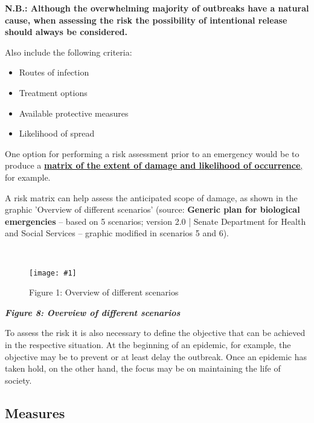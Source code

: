 \documentclass{article}
\newlength{\imgwidth}
\newcommand\scaledgraphics[2]{%
                
\settowidth{\imgwidth}{\texttt{[image: \#1]}}%
                
\setlength{\imgwidth}{\minof{\imgwidth}{#2\textwidth}}%
                
\texttt{[image: \#1]}%
                
}
\begin{document}
\textbf{N.B.: Although the overwhelming majority of outbreaks have a natural cause, when assessing the risk the possibility of intentional release should always be considered.}


Also include the following criteria:

\begin{itemize}
\item Routes of infection


\item Treatment options


\item Available protective measures


\item Likelihood of spread


\end{itemize}

One option for performing a risk assessment prior to an emergency would be to produce a \textbf{\href{https://www.bbk.bund.de/SharedDocs/Downloads/BBK/DE/Downloads/Krisenmanagement/matrix_abb.html}{matrix of the extent of damage and likelihood of occurrence}}\href{https://www.bbk.bund.de/SharedDocs/Downloads/BBK/DE/Downloads/Krisenmanagement/matrix_abb.html}{,} for example.


A risk matrix can help assess the anticipated scope of damage, as shown in the graphic 'Overview of different scenarios' (source: \textbf{Generic plan for biological} \textbf{emergencies }– based on 5 scenarios; version 2.0 |\textbf{ }Senate Department for Health and Social Services – graphic modified in scenarios 5 and 6).


 

\begin{figure}
\scaledgraphics{0756f27c-38f1-4558-8d9c-34917f8a8830.png}{1}
\caption*{Figure 1: Overview of different scenarios}\label{F90469971}
\end{figure}


\emph{\textbf{Figure 8: Overview of different scenarios}}


To assess the risk it is also necessary to define the objective that can be achieved in the respective situation. At the beginning of an epidemic, for example, the objective may be to prevent or at least delay the outbreak. Once an epidemic has taken hold, on the other hand, the focus may be on maintaining the life of society.


\subsection{Measures}\label{H5288134}
\end{document}

